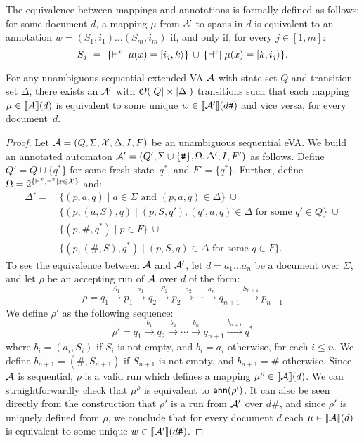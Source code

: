 The equivalence between mappings and annotations is formally defined as follows: for some document $d$, a mapping $\mu$ from $\mathcal{X}$ to spans in $d$ is equivalent to an annotation $w = (S_1,i_1)\ldots(S_m, i_m)$ if, and only if, for every $j\in[1,m]$: 
\[
S_j \ = \ \{\vdash^{x} \mid \mu(x) = [i_j,k\rangle\} \, \cup \, \{\dashv^{x} \mid \mu(x) = [k,i_j\rangle\}.
\]
\begin{proposition}\label{slps:prop:eva-reduc}
	For any unambiguous sequential extended VA $\mathcal{A}$ with state set $Q$ and transition set $\Delta$, there exists an \rt $\mathcal{A}'$ with $\mathcal{O}(|Q|\times|\Delta|)$ transitions 	such that each mapping $\mu\in {\llbracket{A}\rrbracket}(d)$ is equivalent to some unique $w\in{\llbracket{\mathcal{A}'}\rrbracket}(d\texttt{\#})$ and vice versa, for every document~$d$.
\end{proposition}
\begin{proof}
	Let $\mathcal{A} = (Q, \Sigma, \mathcal{X}, \Delta, I, F)$ be an unambiguous sequential eVA. We build an annotated automaton $\mathcal{A}' = (Q', \Sigma\cup\{\texttt{\#}\}, \Omega, \Delta', I, F')$ as follows.  Define $Q' = Q \cup \{q^*\}$ for some fresh state~$q^*$, and $F' = \{q^*\}$. Further, define $\Omega = 2^{\{\vdash^{x} , \dashv^{x}\mid x\in\mathcal{X}\}}$ and: 
	\begin{align*}
		\Delta' = \ &\{(p,a,q)\mid a\in \Sigma\text{ and }(p,a,q)\in\Delta\}\  \cup\\ & \{(p,(a, S), q)\mid (p,S,q'),(q',a,q)\in\Delta \text{ for some }q'\in Q\}\ \cup\\ & \{(p,\texttt{\#}, q^*)\mid p\in F\}\ \cup\\ & \{(p,(\texttt{\#}, S), q^*)\mid (p,S,q)\in\Delta\text{ for some }q\in F\}.
	\end{align*}
	To see the equivalence between $\mathcal{A}$ and $\mathcal{A}'$, let $d = a_1\ldots a_n$ be a document over $\Sigma$, and let $\rho$ be an accepting run of $\mathcal{A}$ over $d$ of the form:
	$$
	\rho = q_1 \xrightarrow{S_1} p_1 \xrightarrow{a_1} 
	q_2  \xrightarrow{S_2} p_2 \xrightarrow{a_2} \cdots 
	\xrightarrow{a_n} q_{n+1} \xrightarrow{S_{n+1}} p_{n+1}
	$$
	We define $\rho'$ as the following sequence:
	$$
	\rho' = q_1  \xrightarrow{b_1} 
	q_2  \xrightarrow{b_2} \cdots 
	\xrightarrow{b_n} q_{n+1}  \xrightarrow{b_{n+1}} q^*
	$$
	where $b_i  = (a_i, S_i)$ if $S_i$ is not empty, and $b_i = a_i$ otherwise, for each $i\leq n$. We define $b_{n+1} = (\texttt{\#}, S_{n+1})$ if $S_{n+1}$ is not empty, and $b_{n+1} = \texttt{\#}$ otherwise. Since $\mathcal{A}$ is sequential, $\rho$ is a valid run which defines a mapping $\mu^\rho\in{\llbracket{\mathcal{A}}\rrbracket}(d)$. We can straightforwardly check that $\mu^\rho$ is equivalent to $\textsf{ann}(\rho')$.
	It can also be seen directly from the construction that $\rho'$ is a run from $\mathcal{A}'$ over $d\texttt{\#}$, and since $\rho'$ is uniquely defined from $\rho$, we conclude that for every document $d$ each $\mu\in{\llbracket{\mathcal{A}}\rrbracket}(d)$ is equivalent to some unique $w\in{\llbracket{\mathcal{A}'}\rrbracket}(d\texttt{\#})$.
	

\end{proof}
